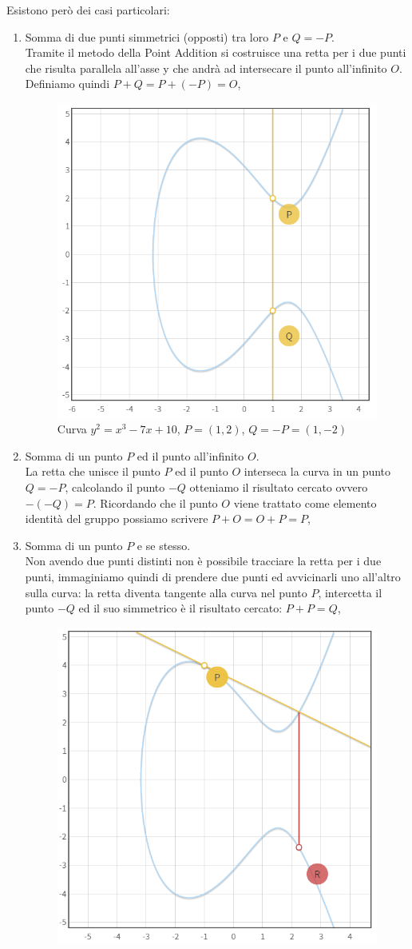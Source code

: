 \documentclass[a4paper,12pt]{tesiinfo}
\begin{document}
Esistono per\`o dei casi particolari:
\begin{enumerate}
    \item Somma di due punti simmetrici (opposti) tra loro $P$ e $Q = -P$. 
    \\
    Tramite il metodo della Point Addition si costruisce una retta per i due punti che risulta parallela all'asse y che andr\`a ad intersecare il punto all'infinito $O$. Definiamo quindi $P + Q = P+(-P) = O$,
    \begin{figure}[H]
        \includegraphics[width=.6\textwidth,center]{PA_P+(-P)}
        \caption{Curva $y^2 = x^3-7x+10$, $P=(1, 2)$, $Q=-P=(1, -2)$}
    \end{figure}
    \item Somma di un punto $P$ ed il punto all'infinito $O$. 
    \\ 
    La retta che unisce il punto $P$ ed il punto $O$ interseca la curva in un punto $Q = -P$, calcolando il punto $-Q$ otteniamo il risultato cercato ovvero $-(-Q) = P$.
    Ricordando che il punto $O$ viene trattato come elemento identit\`a del gruppo possiamo scrivere $P+O = O+P = P$,
    \item Somma di un punto $P$ e se stesso. 
    \\
    Non avendo due punti distinti non \`e possibile tracciare la retta per i due punti, immaginiamo quindi di prendere due punti ed avvicinarli uno all'altro sulla curva: la retta diventa tangente alla curva nel punto $P$, intercetta il punto $-Q$ ed il suo simmetrico \`e il risultato cercato: $P + P = Q$,
    \begin{figure}[H]
        \includegraphics[width=.6\textwidth,center]{PA_P+P}

\end{figure}
\end{enumerate}
\end{document}
